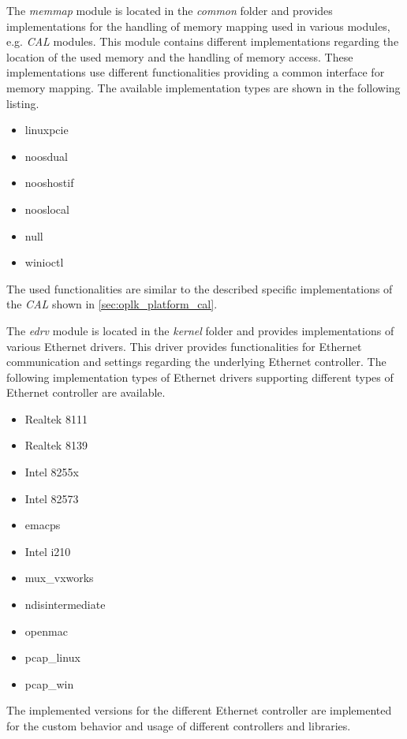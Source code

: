 \begin{description}[leftmargin=1cm]
    \item[memmap] The \emph{memmap} module is located in the \emph{common} folder and provides implementations for the handling of memory mapping used in various modules, e.g. \emph{CAL} modules.
    This module contains different implementations regarding the location of the used memory and the handling of memory access.
    These implementations use different functionalities providing a common interface for memory mapping.
    The available implementation types are shown in the following listing.
    \begin{multicols}{3}
        \begin{itemize}
            \item linuxpcie
            \item noosdual
            \item nooshostif
            \item nooslocal
            \item null
            \item winioctl
        \end{itemize}
    \end{multicols}
    The used functionalities are similar to the described specific implementations of the \emph{CAL} shown in \ref{sec:oplk_platform_cal}.\\
    
    \item[edrv] The \emph{edrv} module is located in the \emph{kernel} folder and provides implementations of various Ethernet drivers.
    This driver provides functionalities for Ethernet communication and settings regarding the underlying Ethernet controller.
    The following implementation types of Ethernet drivers supporting different types of Ethernet controller are available.
    \begin{multicols}{3}
        \begin{itemize}
            \item Realtek 8111
            \item Realtek 8139
            \item Intel 8255x
            \item Intel 82573
            \item emacps
            \item Intel i210
            \item mux\_vxworks
            \item ndisintermediate
            \item openmac
            \item pcap\_linux
            \item pcap\_win
        \end{itemize}
    \end{multicols}
    The implemented versions for the different Ethernet controller are implemented for the custom behavior and usage of different controllers and libraries.
    \\
    

\end{description}
